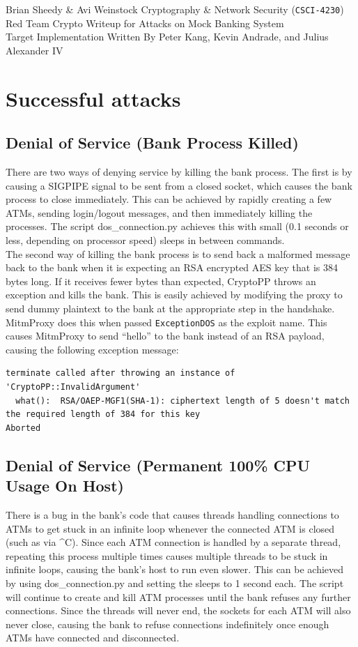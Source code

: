 \documentclass[12pt]{article}
\begin{document}
\noindent
Brian Sheedy \& Avi Weinstock \hfill Cryptography \& Network Security (\Verb|CSCI-4230|)\\
Red Team Crypto Writeup for Attacks on Mock Banking System\\
Target Implementation Written By Peter Kang, Kevin Andrade, and Julius Alexander IV
\doublespace

\section*{Successful attacks}
\subsection*{Denial of Service (Bank Process Killed)}
There are two ways of denying service by killing the bank process. The first is by causing a SIGPIPE signal to be sent from a closed socket, which causes the bank process to close immediately. This can be achieved by rapidly creating a few ATMs, sending login/logout messages, and then immediately killing the processes. The script dos\_connection.py achieves this with small (0.1 seconds or less, depending on processor speed) sleeps in between commands.\\
The second way of killing the bank process is to send back a malformed message back to the bank when it is expecting an RSA encrypted AES key that is 384 bytes long. If it receives fewer bytes than expected, CryptoPP throws an exception and kills the bank. This is easily achieved by modifying the proxy to send dummy plaintext to the bank at the appropriate step in the handshake. MitmProxy does this when passed \verb|ExceptionDOS| as the exploit name. This causes MitmProxy to send ``hello'' to the bank instead of an RSA payload, causing the following exception message:
\begin{Verbatim}[frame=single,fontsize=\scriptsize]
terminate called after throwing an instance of 'CryptoPP::InvalidArgument'
  what():  RSA/OAEP-MGF1(SHA-1): ciphertext length of 5 doesn't match the required length of 384 for this key
Aborted
\end{Verbatim}
\subsection*{Denial of Service (Permanent 100\% CPU Usage On Host)}
There is a bug in the bank’s code that causes threads handling connections to ATMs to get stuck in an infinite loop whenever the connected ATM is closed (such as via \^{}C). Since each ATM connection is handled by a separate thread, repeating this process multiple times causes multiple threads to be stuck in infinite loops, causing the bank's host to run even slower. This can be achieved by using dos\_connection.py and setting the sleeps to 1 second each. The script will continue to create and kill ATM processes until the bank refuses any further connections. Since the threads will never end, the sockets for each ATM will also never close, causing the bank to refuse connections indefinitely once enough ATMs have connected and disconnected.
\end{document}
